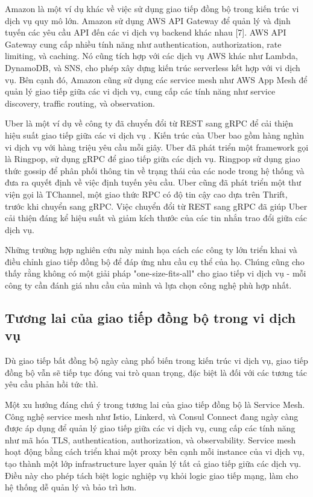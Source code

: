 Amazon là một ví dụ khác về việc sử dụng giao tiếp đồng bộ trong kiến trúc vi dịch vụ quy mô lớn. Amazon sử dụng AWS API Gateway để quản lý và định tuyến các yêu cầu API đến các vi dịch vụ backend khác nhau [7]. AWS API Gateway cung cấp nhiều tính năng như authentication, authorization, rate limiting, và caching. Nó cũng tích hợp với các dịch vụ AWS khác như Lambda, DynamoDB, và SNS, cho phép xây dựng kiến trúc serverless kết hợp với vi dịch vụ. Bên cạnh đó, Amazon cũng sử dụng các service mesh như AWS App Mesh để quản lý giao tiếp giữa các vi dịch vụ, cung cấp các tính năng như service discovery, traffic routing, và observation.

Uber là một ví dụ về công ty đã chuyển đổi từ REST sang gRPC để cải thiện hiệu suất giao tiếp giữa các vi dịch vụ \cite{beyer2018}. Kiến trúc của Uber bao gồm hàng nghìn vi dịch vụ với hàng triệu yêu cầu mỗi giây. Uber đã phát triển một framework gọi là Ringpop, sử dụng gRPC để giao tiếp giữa các dịch vụ. Ringpop sử dụng giao thức gossip để phân phối thông tin về trạng thái của các node trong hệ thống và đưa ra quyết định về việc định tuyến yêu cầu. Uber cũng đã phát triển một thư viện gọi là TChannel, một giao thức RPC có độ tin cậy cao dựa trên Thrift, trước khi chuyển sang gRPC. Việc chuyển đổi từ REST sang gRPC đã giúp Uber cải thiện đáng kể hiệu suất và giảm kích thước của các tin nhắn trao đổi giữa các dịch vụ.

Những trường hợp nghiên cứu này minh họa cách các công ty lớn triển khai và điều chỉnh giao tiếp đồng bộ để đáp ứng nhu cầu cụ thể của họ. Chúng cũng cho thấy rằng không có một giải pháp "one-size-fits-all" cho giao tiếp vi dịch vụ - mỗi công ty cần đánh giá nhu cầu của mình và lựa chọn công nghệ phù hợp nhất.

\subsection{Tương lai của giao tiếp đồng bộ trong vi dịch vụ}
Dù giao tiếp bất đồng bộ ngày càng phổ biến trong kiến trúc vi dịch vụ, giao tiếp đồng bộ vẫn sẽ tiếp tục đóng vai trò quan trọng, đặc biệt là đối với các tương tác yêu cầu phản hồi tức thì.

Một xu hướng đáng chú ý trong tương lai của giao tiếp đồng bộ là Service Mesh. Công nghệ service mesh như Istio, Linkerd, và Consul Connect đang ngày càng được áp dụng để quản lý giao tiếp giữa các vi dịch vụ, cung cấp các tính năng như mã hóa TLS, authentication, authorization, và observability. Service mesh hoạt động bằng cách triển khai một proxy bên cạnh mỗi instance của vi dịch vụ, tạo thành một lớp infrastructure layer quản lý tất cả giao tiếp giữa các dịch vụ. Điều này cho phép tách biệt logic nghiệp vụ khỏi logic giao tiếp mạng, làm cho hệ thống dễ quản lý và bảo trì hơn.

